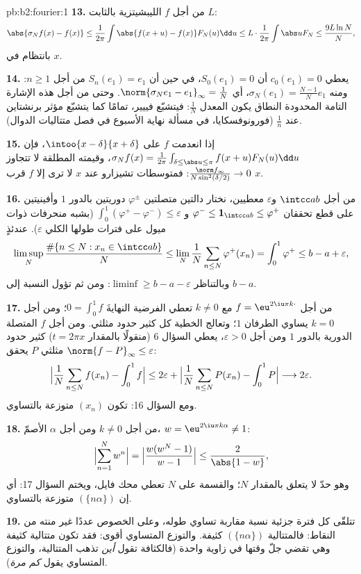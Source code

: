\begin{solution}{pb:b2:fourier:1}
\textbf{13.} من أجل $f$ الليبشيتزية بالثابت $L$:
\[
\abs{\sigma_Nf(x) - f(x)}
\leq \frac{1}{2\pi}\int\abs{f(x+u) - f(x)}F_N(u)\dd u
\leq L\cdot\frac{1}{2\pi}\int\abs uF_N
\leq \frac{9L\ln N}{N},
\]
بانتظام في $x$.

\textbf{14.} يعطي $c_0(e_1) = 0$ أن $S_0(e_1) = 0$، في حين أن
$S_n(e_1) = e_1$ من أجل $n \geq 1$: ومنه $\sigma_N(e_1) =
\frac{N-1}{N}e_1$، أي $\norm{\sigma_Ne_1 - e_1}_\infty =
\frac1N$. وحتى من أجل هذه الإشارة التامة المحدودة النطاق يكون المعدل
$\frac1N$: فيتشبّع فييير، تمامًا كما يتشبّع مؤثر برنشتاين
عند $\frac1n$ (فورونوفسكايا، في مسألة نهاية الأسبوع
في فصل متتاليات الدوال).

\textbf{15.} إذا انعدمت $f$ على $\intoo{x-\delta}{x+\delta}$،
فإن $\sigma_Nf(x) = \frac{1}{2\pi}\int_{\delta \leq \abs u
\leq \pi}f(x+u)F_N(u)\dd u$، وقيمته المطلقة لا تتجاوز
$\frac{\norm f_\infty}{N\sin^2(\delta/2)} \to 0$: فمتوسطات تشيزارو
عند $x$ لا ترى إلا $f$ قرب $x$.

\textbf{16.} من أجل $\intcc ab$ و$\varepsilon$ معطيين، نختار
دالتين متصلتين $\varphi^\pm$ دوريتين بالدور $1$ وأفينيتين على قطع تحققان
$\varphi^- \leq \mathbf 1_{\intcc ab} \leq \varphi^+$ و
$\int_0^1(\varphi^+ - \varphi^-) \leq \varepsilon$ (بشبه منحرفات
ذوات ميول على فترات طولها الكلي $\varepsilon$).
عندئذٍ
\[
\limsup_N\frac{\#\{n \leq N : x_n \in \intcc ab\}}{N}
\leq \lim_N\frac1N\sum_{n\leq N}\varphi^+(x_n)
= \int_0^1\varphi^+ \leq b - a + \varepsilon ,
\]
وبالتناظر $\liminf \geq b - a - \varepsilon$: ومن ثم تؤول
النسبة إلى $b - a$.

\textbf{17.} من أجل $f = \eu^{2\iu\pi k\cdot}$ مع $k \neq 0$ تعطي
الفرضية النهايةَ $0 = \int_0^1f$؛ ومن أجل $k = 0$ يساوي الطرفان
$1$؛ وتعالج الخطية كل كثير حدود
مثلثي. ومن أجل $f$ المتصلة الدورية بالدور $1$ ومن أجل $\varepsilon >
0$، يعطي السؤال 6 (منقولًا بالمقدار $t = 2\pi x$)
كثير حدود مثلثي $P$ يحقق $\norm{f - P}_\infty \leq
\varepsilon$:
\[
\Bigl|\frac1N\sum_{n\leq N}f(x_n) - \int_0^1f\Bigr|
\leq 2\varepsilon +
\Bigl|\frac1N\sum_{n\leq N}P(x_n) - \int_0^1P\Bigr|
\longrightarrow 2\varepsilon .
\]
ومع السؤال 16: تكون $(x_n)$ متوزعة بالتساوي.

\textbf{18.} من أجل $k \neq 0$ ومن أجل $\alpha$ الأصمّ، $w =
\eu^{2\iu\pi k\alpha} \neq 1$:
\[
\Bigl|\sum_{n=1}^{N}w^n\Bigr|
= \Bigl|\frac{w(w^N - 1)}{w - 1}\Bigr|
\leq \frac{2}{\abs{1 - w}} ,
\]
وهو حدّ لا يتعلق بالمقدار $N$؛ والقسمة على $N$ تعطي محك
فايل، ويختم السؤال 17: أي إن $(\{n\alpha\})$
متوزعة بالتساوي.

\textbf{19.} تتلقّى كل فترة جزئية نسبة مقاربة
تساوي طوله، وعلى الخصوص عددًا غير منته من النقاط:
فالمتتالية $(\{n\alpha\})$ كثيفة. والتوزع المتساوي أقوى: فقد تكون
متتالية كثيفة وهي تقضي جلّ وقتها في زاوية
واحدة (فالكثافة تقول \emph{أين} تذهب المتتالية،
والتوزع المتساوي يقول \emph{كم مرة}).


\end{solution}
